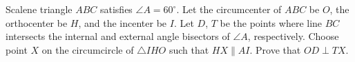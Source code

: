 Scalene triangle $ABC$ satisfies $\angle A = 60^{\circ}$. Let the circumcenter of $ABC$ be $O$,  the orthocenter be $H$,  and the incenter be $I$. Let $D$,  $T$ be the points where line $BC$ intersects the internal and external angle bisectors of $\angle A$,  respectively. Choose point $X$ on the circumcircle of $\triangle IHO$ such that $HX \parallel AI$. Prove that $OD \perp TX$.